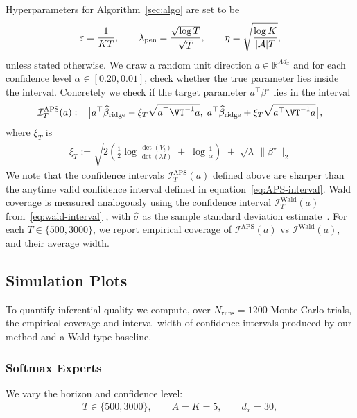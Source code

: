 \documentclass[11pt,letterpaper]{article}
\newcommand{\numactions}{|\mathcal{A}|}
\theoremstyle{plain}
\theoremstyle{definition}  %
\begin{document}
\noindent Hyperparameters for Algorithm~\ref{sec:algo} are set to be
\begin{align*}
\varepsilon = \frac{1}{KT},\qquad
\lambda_{\rm pen}= \frac{\sqrt{\log T}}{\sqrt{T}},\qquad
\eta = \sqrt{\frac{\log K}{ \numactions T}},
\end{align*}
unless stated otherwise. We draw a random unit direction $a\in\mathbb{R}^{A d_x}$ and for each confidence level $\alpha \in [0.20, 0.01]$, check whether the true parameter lies inside the interval. Concretely we check if the target parameter $a^\top\beta^\star$ lies in the interval 
\begin{align*}
\mathcal{I}^{\mathrm{APS}}_T(a) :=  \big[a^\top\widehat\beta_{\mathrm{ridge}}-\xi_T\sqrt{a^\top \VT^{-1}a},\;
a^\top\widehat\beta_{\mathrm{ridge}}+\xi_T\sqrt{a^\top \VT^{-1}a}\big],
\end{align*}
where $\xi_T$ is
\begin{align}
    \xi_T :=  \sqrt{
2\!\left(
\frac{1}{2}\log\frac{\det(V_t)}{\det(\lambda I)}
\;+\;
\log\frac{1}{\alpha}
\right)
}
\;+\;
\sqrt{\lambda}\,\|\beta^\star\|_2
\end{align}
We note that the confidence intervals $\mathcal{I}^{\mathrm{APS}}_T(a)$ defined above are sharper than the anytime valid confidence interval defined in equation~\eqref{eq:APS-interval}. Wald coverage is measured analogously using the confidence
 interval $ \mathcal{I}^{\mathrm{Wald}}_T(a)$ from~\eqref{eq:wald-interval} , with $\widehat{\sigma}$ as the sample standard deviation estimate~\cite[Lemma 3]{lai1982least}. For each $T \in \{500, 3000 \}$, we report empirical coverage of $\mathcal{I}^{\mathrm{APS}}(a)$ vs $\mathcal{I}^{\mathrm{Wald}}(a)$, and their average width.


\subsection{Simulation Plots}

\noindent To quantify inferential quality we compute, over $N_{\mathrm{runs}}=1200$ Monte Carlo trials, the empirical coverage and interval width of confidence intervals produced by our method and a Wald-type baseline. 

\subsubsection*{Softmax Experts}

\noindent We vary the horizon and confidence level: 
\begin{align*}
T\in\{500,3000\},\qquad
A=K=5,\qquad
d_x=30,
\end{align*}
\end{document}
